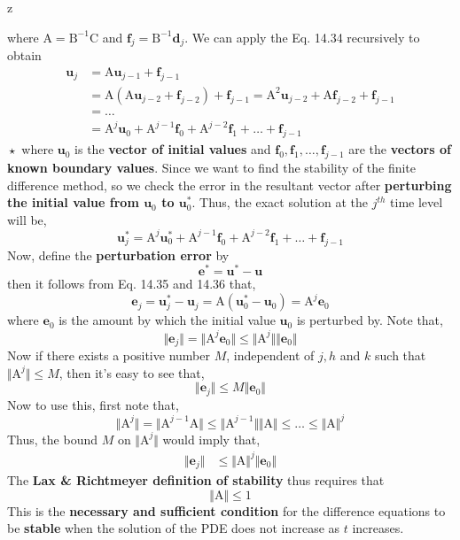z\documentclass[a4paper,12pt,twoside]{book}
\newcommand{\nll}[0]{\newline\newline}
\newcommand{\vect}[1]{\bm{#1}}
\newcommand{\mat}[1]{\bm{\mathrm{#1}}}
\newcommand{\norm}[1]{\Vert #1 \Vert}
\begin{document}
where $\mat{A} = \mat{B}^{-1}\mat{C}$ and $\vect{f}_j = \mat{B}^{-1}\vect{d}_j$.
\nll
We can apply the Eq. 14.34 recursively to obtain
\begin{equation}
    \begin{split}
        \vect{u}_j &= \mat{A}\vect{u}_{j-1} + \vect{f}_{j-1} \\
        &= \mat{A}(\mat{A}\vect{u}_{j-2} + \vect{f}_{j-2}) + \vect{f}_{j-1} = \mat{A}^2\vect{u}_{j-2} + \mat{A}\vect{f}_{j-2} + \vect{f}_{j-1}\\
        &= \dots\\
        &= \mat{A}^j\vect{u}_0 +  \mat{A}^{j-1}\vect{f}_0 +  \mat{A}^{j-2}\vect{f}_1 + \dots + \vect{f}_{j-1}
    \end{split}
\end{equation}
$\boxed{\star}$ where $\vect{u}_0$ is the \textbf{vector of initial values} and $\vect{f}_0,\vect{f}_1,\dots,\vect{f}_{j-1}$ are the \textbf{vectors of known boundary values}.
\nll
Since we want to find the stability of the finite difference method, so we check the error in the resultant vector after \textbf{perturbing the initial value from $\vect{u}_0$ to $\vect{u}_0^*$}. Thus, the exact solution at the $j^{th}$ time level will be,
\begin{equation}
  \vect{u}_j^* = \mat{A}^j\vect{u}_0^* +  \mat{A}^{j-1}\vect{f}_0 +  \mat{A}^{j-2}\vect{f}_1 + \dots + \vect{f}_{j-1}
\end{equation}
Now, define the \textbf{perturbation error} by 
\[\vect{e}^* = \vect{u}^* - \vect{u}\]
then it follows from Eq. 14.35 and 14.36 that,
\[\vect{e}_j = \vect{u}_j^* - \vect{u}_j = \mat{A}(\vect{u}_0^* - \vect{u}_0) = \mat{A}^j\vect{e}_0\]
where $\vect{e}_0$ is the amount by which the initial value $\vect{u}_0$ is perturbed by.
\nll
Note that,
\begin{equation}
    \norm{\vect{e}_j} = \norm{\mat{A}^j\vect{e}_0} \le \norm{\mat{A}^j}\norm{\vect{e}_0}
\end{equation}
Now if there exists a positive number $M$, independent of $j,h$ and $k$ such that $\norm{\mat{A}^j} \le M$, then it's easy to see that,
\[\norm{\vect{e}_j} \le M\norm{\vect{e}_0}\]
Now to use this, first note that,
\[\norm{\mat{A}^j} = \norm{\mat{A}^{j-1}\mat{A}}\le \norm{\mat{A}^{j-1}}\norm{\mat{A}}\le \dots\le \norm{\mat{A}}^j\]
Thus, the bound $M$ on $\norm{\mat{A}^j}$ would imply that,
\begin{equation*}
\begin{split}
    \norm{\vect{e}_j} &\le \norm{\mat{A}}^j\norm{\vect{e}_0}
    \end{split}
\end{equation*}
The \textbf{Lax \& Richtmeyer definition of stability} thus requires that
\begin{equation}
\boxed{    \norm{\mat{A}} \le 1}
\end{equation}
This is the \textbf{necessary and sufficient condition} for the difference equations to be \textbf{stable} when the solution of the PDE does not increase as $t$ increases. 
\end{document}
